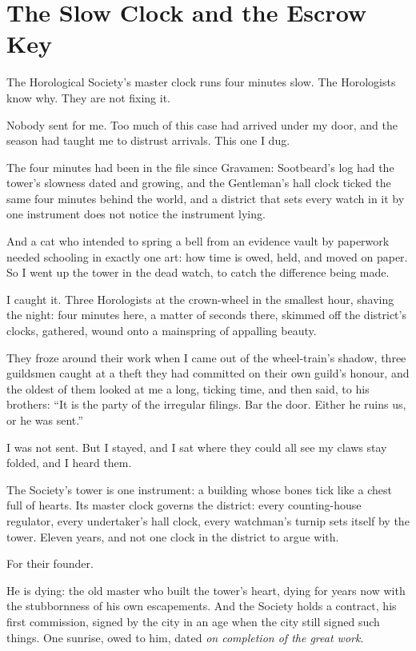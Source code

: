 \chapter{The Slow Clock and the Escrow Key}

The Horological Society's master clock runs four minutes slow. The Horologists know why. They are not fixing it.

Nobody sent for me. Too much of this case had arrived under my door, and the season had taught me to distrust arrivals. This one I dug.

The four minutes had been in the file since Gravamen: Sootbeard's log had the tower's slowness dated and growing, and the Gentleman's hall clock ticked the same four minutes behind the world, and a district that sets every watch in it by one instrument does not notice the instrument lying.

And a cat who intended to spring a bell from an evidence vault by paperwork needed schooling in exactly one art: how time is owed, held, and moved on paper. So I went up the tower in the dead watch, to catch the difference being made.

I caught it. Three Horologists at the crown-wheel in the smallest hour, shaving the night: four minutes here, a matter of seconds there, skimmed off the district's clocks, gathered, wound onto a mainspring of appalling beauty.

They froze around their work when I came out of the wheel-train's shadow, three guildsmen caught at a theft they had committed on their own guild's honour, and the oldest of them looked at me a long, ticking time, and then said, to his brothers: ``It is the party of the irregular filings. Bar the door. Either he ruins us, or he was sent.''

I was not sent. But I stayed, and I sat where they could all see my claws stay folded, and I heard them.

The Society's tower is one instrument: a building whose bones tick like a chest full of hearts. Its master clock governs the district: every counting-house regulator, every undertaker's hall clock, every watchman's turnip sets itself by the tower. Eleven years, and not one clock in the district to argue with.

For their founder.

He is dying: the old master who built the tower's heart, dying for years now with the stubbornness of his own escapements. And the Society holds a contract, his first commission, signed by the city in an age when the city still signed such things. One sunrise, owed to him, dated \emph{on completion of the great work}.

